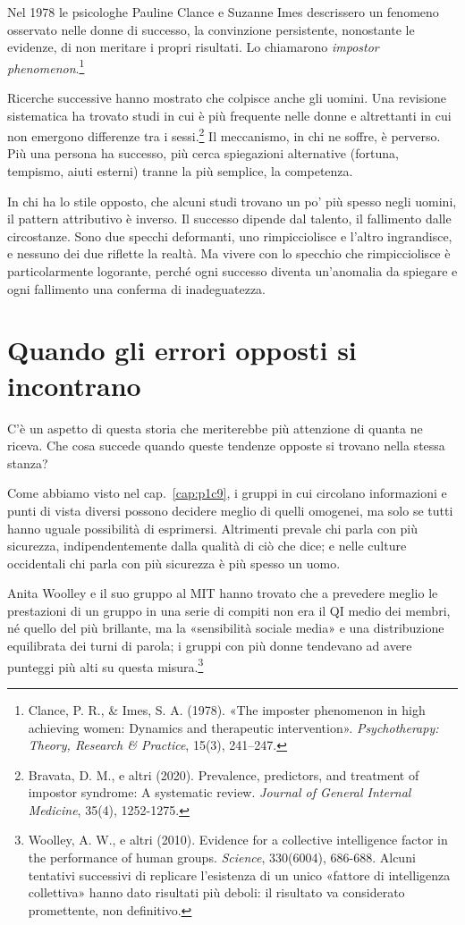 Nel 1978 le psicologhe Pauline Clance e Suzanne Imes descrissero un fenomeno osservato nelle donne di successo, la convinzione persistente, nonostante le evidenze, di non meritare i propri risultati. Lo chiamarono \textit{impostor phenomenon}.\footnote{Clance, P. R., \& Imes, S. A. (1978). «The imposter phenomenon in high achieving women: Dynamics and therapeutic intervention». \textit{Psychotherapy: Theory, Research \& Practice}, 15(3), 241--247.}

Ricerche successive hanno mostrato che colpisce anche gli uomini. Una revisione sistematica ha trovato studi in cui è più frequente nelle donne e altrettanti in cui non emergono differenze tra i sessi.\footnote{Bravata, D. M., e altri (2020). Prevalence, predictors, and treatment of impostor syndrome: A systematic review. \textit{Journal of General Internal Medicine}, 35(4), 1252-1275.} Il meccanismo, in chi ne soffre, è perverso. Più una persona ha successo, più cerca spiegazioni alternative (fortuna, tempismo, aiuti esterni) tranne la più semplice, la competenza.

In chi ha lo stile opposto, che alcuni studi trovano un po' più spesso negli uomini, il pattern attributivo è inverso. Il successo dipende dal talento, il fallimento dalle circostanze. Sono due specchi deformanti, uno rimpicciolisce e l'altro ingrandisce, e nessuno dei due riflette la realtà. Ma vivere con lo specchio che rimpicciolisce è particolarmente logorante, perché ogni successo diventa un'anomalia da spiegare e ogni fallimento una conferma di inadeguatezza.

\section{Quando gli errori opposti si incontrano}

C'è un aspetto di questa storia che meriterebbe più attenzione di quanta ne riceva. Che cosa succede quando queste tendenze opposte si trovano nella stessa stanza?

Come abbiamo visto nel cap.~\ref{cap:p1c9}, i gruppi in cui circolano informazioni e punti di vista diversi possono decidere meglio di quelli omogenei, ma solo se tutti hanno uguale possibilità di esprimersi. Altrimenti prevale chi parla con più sicurezza, indipendentemente dalla qualità di ciò che dice; e nelle culture occidentali chi parla con più sicurezza è più spesso un uomo.

Anita Woolley e il suo gruppo al MIT hanno trovato che a prevedere meglio le prestazioni di un gruppo in una serie di compiti non era il QI medio dei membri, né quello del più brillante, ma la «sensibilità sociale media» e una distribuzione equilibrata dei turni di parola; i gruppi con più donne tendevano ad avere punteggi più alti su questa misura.\footnote{Woolley, A. W., e altri (2010). Evidence for a collective intelligence factor in the performance of human groups. \textit{Science}, 330(6004), 686-688. Alcuni tentativi successivi di replicare l'esistenza di un unico «fattore di intelligenza collettiva» hanno dato risultati più deboli: il risultato va considerato promettente, non definitivo.}

